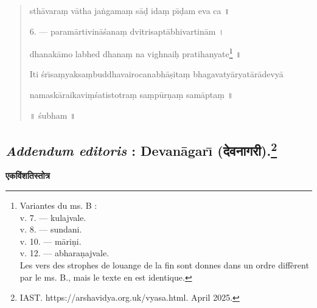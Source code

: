 \documentclass[a4paper, 11pt, oneside, french]{article}
\begin{document}
\begin{quotation}
sth\={a}vara\d{m} v\={a}tha ja\.{n}gama\d{m} s\={a}\d{d} ida\d{m} p\={\i}\d{d}am eva ca \texthindi{॥}

\bigskip

6. --- param\={a}rtivin\={a}\'{s}ana\d{m} dvitrisapt\={a}bhivartin\={a}m \texthindi{।}

dhanak\={a}mo labhed dhana\d{m} na vighnai\d{h} pratihanyate\footnote{Variantes du ms. B :\\\hspace*{10mm}v. 7. --- kulajvale.\\\hspace*{10mm}v. 8. --- sundani.\\\hspace*{10mm}v. 10. --- m\={a}ri\d{n}i.\\\hspace*{10mm}v. 12. --- abhara\d{n}ajvale.\\\hspace*{5mm}Les vers des strophes de louange de la fin sont donnes dans un ordre diffèrent par le ms. B., mais le texte en est identique.} \texthindi{॥}

\bigskip

Iti \'{s}r\={\i}sa\d{m}yaksa\d{m}buddhavairocanabh\={a}\d{s}ita\d{m} bhagavaty\={a}ryat\={a}r\={a}devy\={a}

namask\={a}raikavi\d{m}\'{s}atistotra\d{m} sa\d{m}p\={u}r\d{n}a\d{m} sam\={a}pta\d{m} \texthindi{॥}

\bigskip

\texthindi{॥} \'{s}ubham \texthindi{॥}
\end{quotation}
\clearpage
\subsection[\emph{Addendum editoris} : Devan\={a}gar\={\i} \texthindi{(देवनागरी)}.]{\emph{Addendum editoris} : Devan\={a}gar\={\i} \texthindi{(देवनागरी)}.\footnote{IAST. https://arshavidya.org.uk/vyasa.html. April 2025.}}
\begin{center}
\texthindi{\textbf{एकविंशतिस्तोत्र}}
\end{center}
\end{document}
